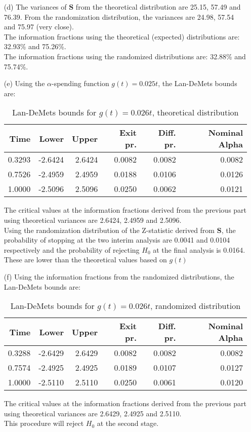 \documentclass[11pt,a4paper]{article}
\begin{document}
\begin{enumerate}
\item[(d)] The variances of $\mathbf{S}$ from the theoretical distribution are 25.15, 57.49 and 76.39. From the randomization distribution, the variances are 24.98, 57.54 and 75.97 (very close). \\ 
The information fractions using the theoretical (expected) distributions are: 32.93\% and 75.26\%. \\
The information fractions using the randomized distributions are: 32.88\% and 75.74\%. 

\item[(e)] Using the $\alpha$-spending function $g(t) = 0.025t$, the Lan-DeMets bounds are:
\begin{table}[H]
\centering
\begin{tabular}{rrrrrr}
  \hline
  Time & Lower & Upper & Exit pr. & Diff. pr. & Nominal Alpha \\ 
  \hline
  0.3293 & -2.6424 & 2.6424 & 0.0082 & 0.0082 & 0.0082 \\ 
  0.7526 & -2.4959 & 2.4959 & 0.0188 & 0.0106 & 0.0126 \\ 
  1.0000 & -2.5096 & 2.5096 & 0.0250 & 0.0062 & 0.0121 \\ 
   \hline
\end{tabular}
\caption{Lan-DeMets bounds for $g(t) = 0.026t$, theoretical distribution}
\end{table}
The critical values at the information fractions derived from the previous part using theoretical variances are 2.6424, 2.4959 and 2.5096. \\
Using the randomization distribution of the Z-statistic derived from $\mathbf{S}$, the probability of stopping at the two interim analysis are 0.0041 and 0.0104 respectively and the probability of rejecting $H_0$ at the final analysis is 0.0164. These are lower than the theoretical values based on $g(t)$

\item[(f)] Using the information fractions from the randomized distributions, the Lan-DeMets bounds are:
\begin{table}[H]
\centering
\begin{tabular}{rrrrrr}
  \hline
  Time & Lower & Upper & Exit pr. & Diff. pr. & Nominal Alpha \\ 
  \hline
  0.3288 & -2.6429 & 2.6429 & 0.0082 & 0.0082 & 0.0082 \\ 
  0.7574 & -2.4925 & 2.4925 & 0.0189 & 0.0107 & 0.0127 \\ 
  1.0000 & -2.5110 & 2.5110 & 0.0250 & 0.0061 & 0.0120 \\ 
   \hline
\end{tabular}
\caption{Lan-DeMets bounds for $g(t) = 0.026t$, randomized distribution}
\end{table}
The critical values at the information fractions derived from the previous part using theoretical variances are 2.6429, 2.4925 and 2.5110. \\ This procedure will reject $H_0$ at the second stage.

\end{enumerate}
\end{document}
